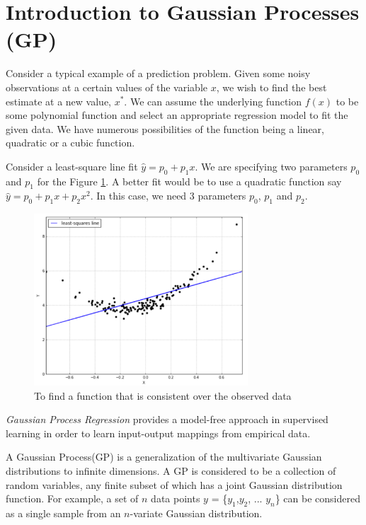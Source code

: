 \documentclass[12pt]{report}
\begin{document}
\section{Introduction to Gaussian Processes (GP)} %
\label{introToGPs} %
Consider a typical example of a prediction problem. Given some noisy observations at a certain values of the variable $x$, we wish to find the best estimate at a new value, $x^*$. We can assume the underlying function $f(x)$ to be some polynomial function and select an appropriate regression model to fit the given data. We have numerous possibilities of the function being a linear, quadratic or a cubic function.\par 
Consider a least-square line fit  $\hat{y} = p_0 + p_1x$. We are specifying two parameters $p_0$ and $p_1$ for the Figure \ref{fig:least_square}. A better fit would be to use a quadratic function say $\hat{y} = p_0 + p_1x + p_2x^2$. In this case, we need $3$ parameters $p_0$, $p_1$ and $p_2$. 

\begin{figure}[H]
	\centering 
	\includegraphics[width=8cm]{ls_fit.pdf}
	\caption{To find a function that is consistent over the observed data}
   \label{fig:least_square}
\end{figure}

\textit{Gaussian Process Regression} provides a model-free approach in supervised learning in order to learn input-output mappings from empirical data.\par 

A Gaussian Process(GP) is a generalization of the multivariate Gaussian distributions to infinite dimensions. A GP is considered to be a collection of random variables, any finite subset of which has a joint Gaussian distribution function. For example, a set of $n$ data points $y$ = \{$y_1$,$y_2$, ... $y_n$\} can be considered as a single sample from an $n$-variate Gaussian distribution.
\end{document}
